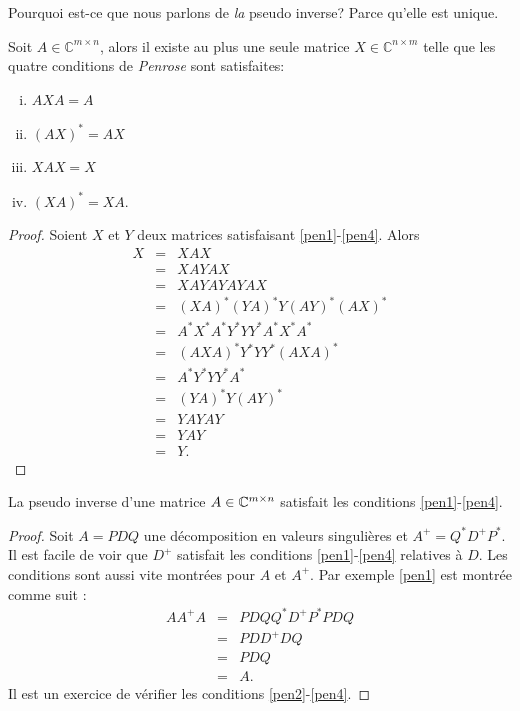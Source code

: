 Pourquoi est-ce que nous parlons de \emph{la} pseudo inverse? Parce qu'elle est unique. 

\begin{theorem}
  \label{thr:22}
  Soit  $A \in ℂ^{m \times n}$, alors il existe au plus une seule matrice $X \in ℂ^{n \times m}$  telle que les quatre conditions de \emph{Penrose} sont satisfaites: 
  \begin{enumerate}[i)] 
  \item $AXA = A$ \label{pen1}
  \item $(AX)^* = AX$ \label{pen2}
  \item $XAX = X$ \label{pen3}
  \item $(XA)^* = XA$. \label{pen4}
  \end{enumerate}
\end{theorem}
\begin{proof}
  Soient $X$ et $Y$ deux matrices satisfaisant \ref{pen1}-\ref{pen4}. Alors
  \begin{eqnarray*}
    X & = & XAX \\
     & = & XAYAX \\
     & = & XAYAYAYAX\\
    & = & (XA)^*(YA)^*Y(AY)^*(AX)^*\\
    & = & A^*X^*A^*Y^*YY^*A^*X^*A^* \\
    & = & (AXA)^*Y^*YY^*(AXA)^* \\
    & = & A^* Y^* Y Y^* A^* \\
    & = & (YA)^* Y (AY)^* \\
    & = & YAYAY \\
    & = & YAY \\
    & = & Y. 
  \end{eqnarray*}
\end{proof}

\begin{theorem}
  \label{thr:23}
  La pseudo inverse d'une matrice $A \in \mathbb{C}^{m \times n}$ satisfait les conditions \ref{pen1}-\ref{pen4}. 
\end{theorem}

\begin{proof}
  Soit $A = PDQ$ une décomposition en valeurs singulières et $A^+ = Q^*D^+P^*$.  Il est facile de voir que $D^+$ satisfait les conditions \ref{pen1}-\ref{pen4} relatives à $D$. Les conditions sont aussi vite montrées pour $A$ et $A^+$. Par exemple \ref{pen1} est montrée comme suit : 
  \begin{eqnarray*}
    A A^+A & = & PDQQ^*D^+P^*PDQ \\
           & = & PDD^+DQ \\
           & = & PDQ\\
           & = & A. 
  \end{eqnarray*}
Il est un exercice de vérifier les  conditions \ref{pen2}-\ref{pen4}.
\end{proof}


